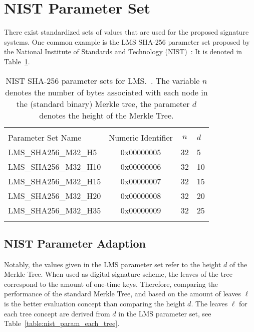 \section{NIST Parameter Set}
There exist standardized sets of values that are used for the proposed signature systems. One common example is the LMS SHA-256 parameter set proposed by the National Institute of Standards and Technology (NIST)~\cite{stateful_hashbased_sign_schemes_NIST_2020}: It is denoted in Table~\ref{table:nist_param_lms}. 

\begin{table}
\centering
\begin{tabular}{l c c l} 
 \hline\noalign{\smallskip}
 \multicolumn{4}{c}{\textbf{NIST Parameter Set, LMS}} \\
 Parameter Set Name & Numeric Identifier & $n$ & $d$\\
 \hline\noalign{\smallskip}
 LMS\_SHA256\_M32\_H5 & 0x00000005  & 32 & 5 \\
 LMS\_SHA256\_M32\_H10 & 0x00000006  & 32 & 10 \\
 LMS\_SHA256\_M32\_H15 & 0x00000007  & 32 & 15 \\
 LMS\_SHA256\_M32\_H20 & 0x00000008  & 32 & 20 \\
 LMS\_SHA256\_M32\_H35 & 0x00000009  & 32 & 25 \\
 \hline\noalign{\smallskip}
 \end{tabular}
\caption{NIST SHA-256 parameter sets for LMS.~\cite{stateful_hashbased_sign_schemes_NIST_2020}. The variable $n$ denotes the number of bytes associated with each node in the (standard binary) Merkle tree, the parameter $d$ denotes the height of the Merkle Tree.}
\label{table:nist_param_lms}
\end{table}

\subsection{NIST Parameter Adaption}
\label{sec:nist_param_to_leaves}
Notably, the values given in the LMS parameter set refer to the height $d$ of the Merkle Tree. When used as digital signature scheme, the leaves of the tree correspond to the amount of one-time keys. Therefore, comparing the performance of the standard Merkle Tree, \tftree and \extree based on the amount of leaves $\ell$ is the better evaluation concept than comparing the height $d$. 
The leaves $\ell$ for each tree concept are derived from $d$ in the LMS parameter set, see Table~\ref{table:nist_param_each_tree}. 

